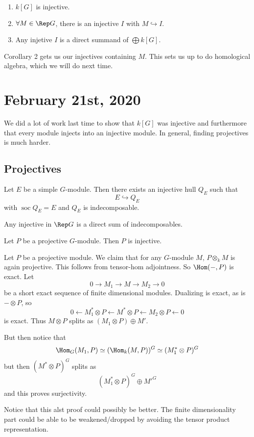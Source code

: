 \documentclass[12pt]{article}
\begin{document}
\begin{thm}
	\begin{enumerate}
		\item $k[G]$ is injective.
		\item $\forall M\in\Rep G$, there is an injective $I$ with $M\hookrightarrow I$.
		\item Any injetive $I$ is a direct summand of $\bigoplus k[G]$.
	\end{enumerate}
\end{thm}
Corollary 2 gets us our injectives containing $M$. This sets us up to do homological algebra, which we will do next time.

\section{February 21st, 2020}
We did a lot of work last time to show that $k[G]$ was injective and furthermore that every module injects into 
an injective module. In general, finding projectives is much harder.

\subsection{Projectives}
\begin{lem}
	Let $E$ be a simple $G$-module. Then there exists an injective hull $Q_E$ such that 
	\[E\hookrightarrow Q_E\]
	with $\operatorname{soc}Q_E=E$ and $Q_E$ is indecomposable.
\end{lem}
\begin{rmk}
	Any injective in $\Rep G$ is a direct sum of indecomposables.
\end{rmk}
\begin{lem}
	Let $P$ be a projective $G$-module. Then $P$ is injective.
\end{lem}
\begin{prf}
	Let $P$ be a projective module. We claim that for any $G$-module $M$, $P\otimes_k M$ is again projective. This follows from tensor-hom adjointness.
	So $\Hom(-,P)$ is exact. Let 
	\[0\to M_1\to M\to M_2\to 0\]
	be a short exact sequence of finite dimensional modules. Dualizing is exact, as is $-\otimes P$, so 
	\[0\leftarrow M_1^\ast\otimes P\leftarrow M^\ast\otimes P\leftarrow M_2\otimes P\leftarrow 0\]
	is exact. Thus $M\otimes P$ splits as $(M_1\otimes P)\oplus M'$.

	But then notice that 
	\[\Hom_G(M_1,P)\simeq(\Hom_k(M,P))^G\simeq(M_1^\ast\otimes P)^G\]
	but then $(M^\ast\otimes P)^G$ splits as 
	\[(M_1^\ast\otimes P)^G\oplus M'^G\]
	and this proves surjectivity.
\end{prf}
\begin{rmk}
	Notice that this alst proof could possibly be better. The finite dimensionality part could be able to be weakened/dropped by
	avoiding the tensor product representation.
\end{rmk}
\end{document}
